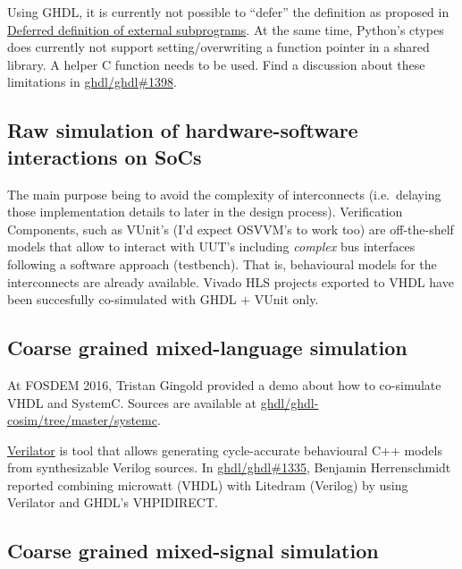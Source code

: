 \documentclass[
]{article}
\begin{document}
Using GHDL, it is currently not possible to ``defer'' the definition as proposed in \protect\hyperlink{deferreddef}{Deferred definition of external subprograms}. At the same time, Python's ctypes does currently not support setting/overwriting a function pointer in a shared library. A helper C function needs to be used. Find a discussion about these limitations in \href{https://github.com/ghdl/ghdl/issues/1398}{ghdl/ghdl\#1398}.

\hypertarget{raw-simulation-of-hardware-software-interactions-on-socs}{%
\subsection{Raw simulation of hardware-software interactions on SoCs}\label{raw-simulation-of-hardware-software-interactions-on-socs}}

The main purpose being to avoid the complexity of interconnects (i.e.~delaying those implementation details to later in the design process). Verification Components, such as VUnit's (I'd expect OSVVM's \autocite{osvvm} to work too) are off-the-shelf models that allow to interact with UUT's including \emph{complex} bus interfaces following a software approach (testbench). That is, behavioural models for the interconnects are already available. Vivado HLS projects exported to VHDL have been succesfully co-simulated with GHDL + VUnit only.

\hypertarget{coarse-grained-mixed-language-simulation}{%
\subsection{Coarse grained mixed-language simulation}\label{coarse-grained-mixed-language-simulation}}

At FOSDEM 2016, Tristan Gingold provided a demo about how to co-simulate VHDL and SystemC. Sources are available at \href{https://github.com/ghdl/ghdl-cosim/tree/master/systemc}{ghdl/ghdl-cosim/tree/master/systemc}.

\href{https://github.com/verilator/verilator}{Verilator} \autocite{verilator} is tool that allows generating cycle-accurate behavioural C++ models from synthesizable Verilog sources. In \href{https://github.com/ghdl/ghdl/issues/1335}{ghdl/ghdl\#1335}, Benjamin Herrenschmidt reported combining microwatt (VHDL) with Litedram (Verilog) by using Verilator and GHDL's VHPIDIRECT.

\hypertarget{coarse-grained-mixed-signal-simulation}{%
\subsection{Coarse grained mixed-signal simulation}\label{coarse-grained-mixed-signal-simulation}}
\end{document}
